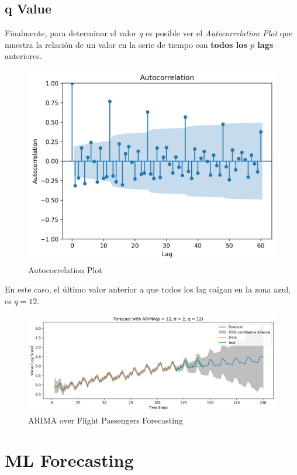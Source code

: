 \subsection{q Value}
Finalmente, para determinar el valor $q$ es posible ver el \textit{Autocorrelation Plot} que muestra la relación de un valor en la serie de tiempo con \textbf{todos los $p$ lags} anteriores. 
\begin{figure}[H]
    \center
    \includegraphics[scale=0.5]{notebooks/TS/img/autocorrelation.png}
    \caption{Autocorrelation Plot}
\end{figure}
En este caso, el último valor anterior a que todos los lag caigan en la zona azul, es $q=12$.
\begin{figure}[H]
    \center
    \includegraphics[scale=0.5]{notebooks/TS/img/arima_results.png}
    \caption{ARIMA over Flight Passengers Forecasting}
\end{figure}

\section{ML Forecasting}

